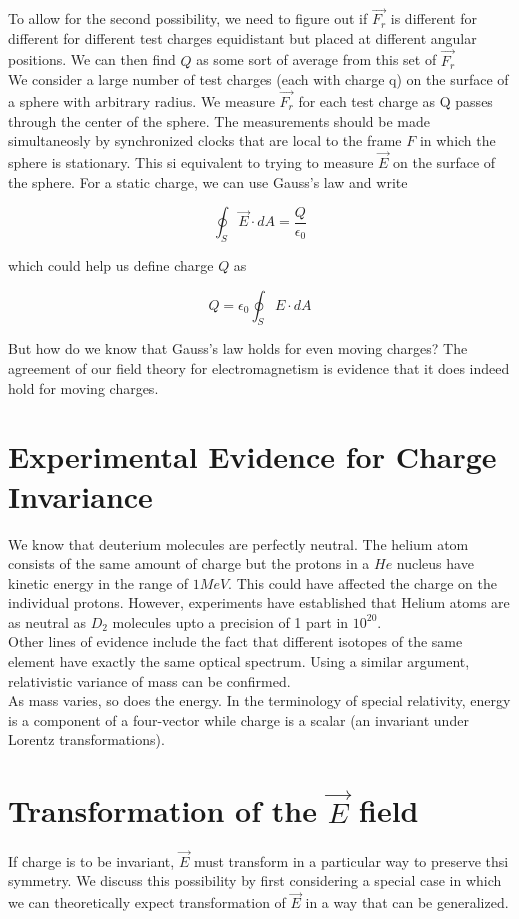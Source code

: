 \documentclass{article}
\begin{document}
	To allow for the second possibility, we need to figure out if $\vec{F_r}$ is different for different for different test charges equidistant but placed at different angular positions. We can then find $Q$ as some sort of average from this set of $\vec{F_r}$\\
	
	We consider a large number of test charges (each with charge q) on the surface of a sphere with arbitrary radius. We measure $\vec{F_r}$ for each test charge as Q passes through the center of the sphere. The measurements should be made simultaneosly by synchronized clocks that are local to the frame $F$ in which the sphere is stationary. This si equivalent to trying to measure $\vec{E}$ on the surface of the sphere. For a static charge, we can use Gauss's law and write
	
	$$ \oint_S \vec{E}\cdot dA = \frac{Q}{\epsilon_0} $$

which could help us define charge $Q$ as
 
 $$ Q = \epsilon_0\oint_S E\cdot dA$$
 
 But how do we know that Gauss's law holds for even moving charges? The agreement of our field theory for electromagnetism is evidence that it does indeed hold for moving charges.
 
 \section{Experimental Evidence for Charge Invariance}
 We know that deuterium molecules are perfectly neutral. The helium atom consists of the same amount of charge but the protons in a $He$ nucleus have kinetic energy in the range of $1 MeV$. This could have affected the charge on the individual protons. However, experiments have established that Helium atoms are as neutral as $D_2$ molecules upto a precision of 1 part in $10^{20}$.\\
 Other lines of evidence include the fact that different isotopes of the same element have exactly the same optical spectrum. Using a similar argument, relativistic variance of mass can be confirmed.\\
 
 As mass varies, so does the energy. In the terminology of special relativity, energy is a component of a four-vector while charge is a scalar (an invariant under Lorentz transformations).
 
 \section{Transformation of the $\vec{E}$ field}
If charge is to be invariant, $\vec{E}$ must transform in a particular way to preserve thsi symmetry. We discuss this possibility by first considering a special case in which we can theoretically expect transformation of $\vec{E}$ in a way that can be generalized.\\
\end{document}
